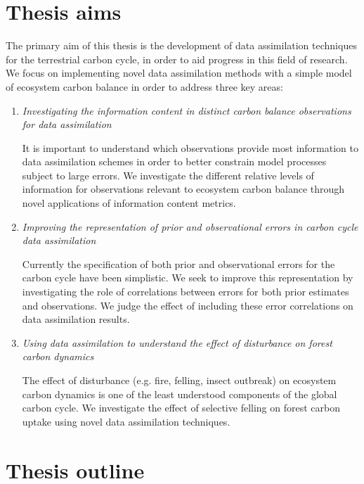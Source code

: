 
\section{Thesis aims}

The primary aim of this thesis is the development of data assimilation techniques for the terrestrial carbon cycle, in order to aid progress in this field of research. We focus on implementing novel data assimilation methods with a simple model of ecosystem carbon balance in order to address three key areas:

\begin{enumerate}
\item \textit{Investigating the information content in distinct carbon balance observations for data assimilation}

It is important to understand which observations provide most information to data assimilation schemes in order to better constrain model processes subject to large errors. We investigate the different relative levels of information for observations relevant to ecosystem carbon balance through novel applications of information content metrics.

\item \textit{Improving the representation of prior and observational errors in carbon cycle data assimilation}

Currently the specification of both prior and observational errors for the carbon cycle have been simplistic. We seek to improve this representation by investigating the role of correlations between errors for both prior estimates and observations. We judge the effect of including these error correlations on data assimilation results.
  
\item \textit{Using data assimilation to understand the effect of disturbance on forest carbon dynamics}

The effect of disturbance (e.g. fire, felling, insect outbreak) on ecosystem carbon dynamics is one of the least understood components of the global carbon cycle. We investigate the effect of selective felling on forest carbon uptake using novel data assimilation techniques.
\end{enumerate}

\section{Thesis outline}

